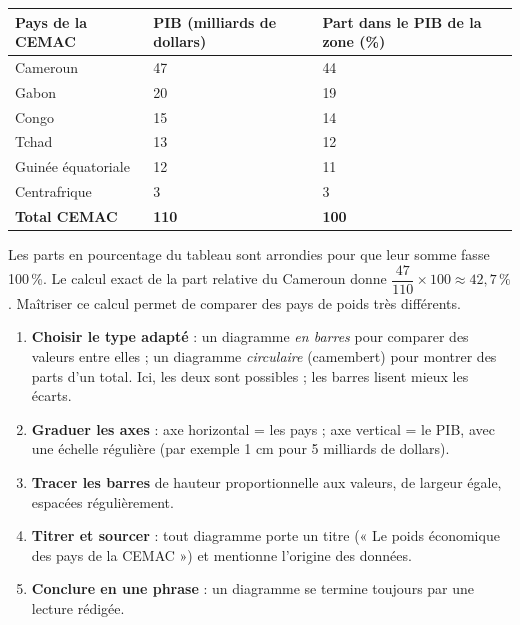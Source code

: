 \documentclass[11pt]{article}
\newcommand{\cle}[1]{{\popxbold\color{popdark}#1}}
\begin{document}
\begin{center}
\begin{tabularx}{\linewidth}{|l|X|X|}\hline
\rowcolor{popblueL} \textbf{Pays de la CEMAC} & \textbf{PIB (milliards de dollars)} & \textbf{Part dans le PIB de la zone (\%)} \\ \hline
Cameroun & 47 & 44 \\ \hline
Gabon & 20 & 19 \\ \hline
Congo & 15 & 14 \\ \hline
Tchad & 13 & 12 \\ \hline
Guinée équatoriale & 12 & 11 \\ \hline
Centrafrique & 3 & 3 \\ \hline
\rowcolor{popcream} \textbf{Total CEMAC} & \textbf{110} & \textbf{100} \\ \hline
\end{tabularx}
\end{center}

Les parts en pourcentage du tableau sont arrondies pour que leur somme fasse 100\,\%. Le calcul exact de la \cle{part relative} du Cameroun donne $\dfrac{47}{110} \times 100 \approx 42,7\,\%$. Maîtriser ce calcul permet de comparer des pays de poids très différents.

\begin{methode}
\begin{enumerate}
\item \textbf{Choisir le type adapté} : un diagramme \emph{en barres} pour comparer des valeurs entre elles ; un diagramme \emph{circulaire} (camembert) pour montrer des parts d'un total. Ici, les deux sont possibles ; les barres lisent mieux les écarts.
\item \textbf{Graduer les axes} : axe horizontal = les pays ; axe vertical = le PIB, avec une échelle régulière (par exemple 1 cm pour 5 milliards de dollars).
\item \textbf{Tracer les barres} de hauteur proportionnelle aux valeurs, de largeur égale, espacées régulièrement.
\item \textbf{Titrer et sourcer} : tout diagramme porte un titre (« Le poids économique des pays de la CEMAC ») et mentionne l'origine des données.
\item \textbf{Conclure en une phrase} : un diagramme se termine toujours par une lecture rédigée.
\end{enumerate}
\end{methode}
\end{document}
